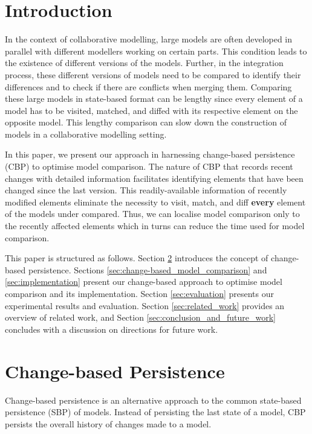 \documentclass{llncs}
\begin{document}
\vspace{-20pt}
\section{Introduction}
\label{sec:introduction}
In the context of collaborative modelling, large models are often developed in parallel with different modellers working on certain parts. This condition leads to the existence of different versions of the models. Further, in the integration process, these different versions of models need to be compared to identify their differences and to check if there are conflicts when merging them. Comparing these large models in state-based format can be lengthy since every element of a model has to be visited, matched, and diffed with its respective element on the opposite model. 
This lengthy comparison can slow down the construction of models in a collaborative modelling setting. 

In this paper, we present our approach in harnessing change-based persistence (CBP) to optimise model comparison. The nature of CBP that records recent changes with detailed information facilitates identifying elements that have been changed since the last version. This readily-available information of recently modified elements eliminate the necessity to visit, match, and diff \textbf{every} element of the models under compared. Thus, we can localise model comparison only to the recently affected elements which in turns can reduce the time used for model comparison. 

This paper is structured as follows. Section \ref{sec:change-based_persistence} introduces the concept of change-based persistence. Sections \ref{sec:change-based_model_comparison} and \ref{sec:implementation} present our change-based approach to optimise model comparison and its implementation. Section \ref{sec:evaluation} presents our experimental results and evaluation. Section \ref{sec:related_work} provides an overview of related work, and Section \ref{sec:conclusion_and_future_work} concludes with a discussion on directions for future work.


\section{Change-based Persistence}
\label{sec:change-based_persistence}
Change-based persistence is an alternative approach to the common state-based persistence (SBP) of models. Instead of persisting the last state of a model, CBP persists the overall history of changes made to a model.
\end{document}
